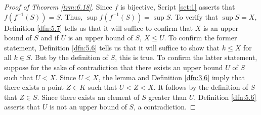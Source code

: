 \documentclass[../main.tex]{subfiles}
\begin{document}
\begin{theorem}
\begin{proof}[Proof of Theorem \ref{trm:6.18}]
        Since $f$ is bijective, Script \ref{sct:1} asserts that $f(f^{-1}(S))=S$. Thus, $\sup f(f^{-1}(S))=\sup S$. To verify that $\sup S=X$, Definition \ref{dfn:5.7} tells us that it will suffice to confirm that $X$ is an upper bound of $S$ and if $U$ is an upper bound of $S$, $X\leq U$. To confirm the former statement, Definition \ref{dfn:5.6} tells us that it will suffice to show that $k\leq X$ for all $k\in S$. But by the definition of $S$, this is true. To confirm the latter statement, suppose for the sake of contradiction that there exists an upper bound $U$ of $S$ such that $U<X$. Since $U<X$, the lemma and Definition \ref{dfn:3.6} imply that there exists a point $Z\in K$ such that $U<Z<X$. It follows by the definition of $S$ that $Z\in S$. Since there exists an element of $S$ greater than $U$, Definition \ref{dfn:5.6} asserts that $U$ is not an upper bound of $S$, a contradiction.
    \end{proof}
\end{theorem}
\end{document}
